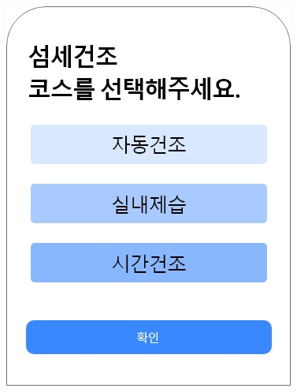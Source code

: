 \documentclass[conference]{IEEEtran}
\begin{document}
\begin{enumerate}
{                \includegraphics[scale=0.3]{assets/섬세건조 선택.jpg}} \\ \\
\end{enumerate}
\end{document}
